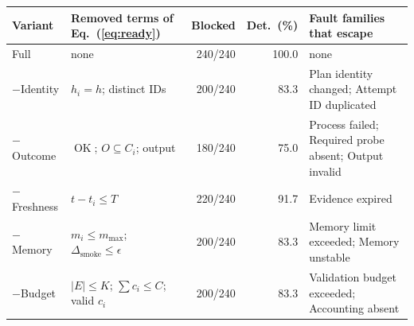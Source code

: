 \begin{tabularx}{\textwidth}{llrrY}
\toprule Variant & Removed terms of Eq.~(\ref{eq:ready}) & Blocked & Det.\ (\%) & Fault families that escape \\
\midrule
Full \tool{} & none & 240/240 & 100.0 & none \\
$-$Identity & $h_i=h$; distinct IDs &200/240 & 83.3 & Plan identity changed; Attempt ID duplicated \\
$-$Outcome & $\operatorname{OK}$; $O\subseteq C_i$; output &180/240 & 75.0 & Process failed; Required probe absent; Output invalid \\
$-$Freshness & $t-t_i\leq T$ &220/240 & 91.7 & Evidence expired \\
$-$Memory & $m_i\leq m_{\max}$; $\Delta_{\mathrm{smoke}}\leq\epsilon$ &200/240 & 83.3 & Memory limit exceeded; Memory unstable \\
$-$Budget & $|E|\leq K$; $\sum c_i\leq C$; valid $c_i$ &200/240 & 83.3 & Validation budget exceeded; Accounting absent \\
\bottomrule
\end{tabularx}
